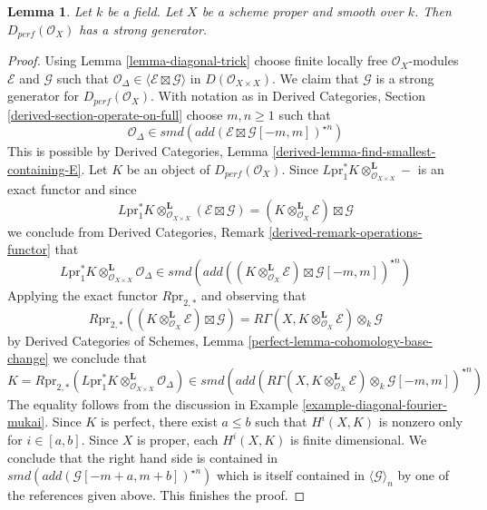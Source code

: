 \documentclass{stacks-project}
\theoremstyle{plain}
\newtheorem{lemma}[subsection]{Lemma}
\theoremstyle{definition}
\theoremstyle{remark}
\numberwithin{equation}{subsection}
\begin{document}
\begin{lemma}
\label{lemma-smooth-proper-strong-generator}
Let $k$ be a field. Let $X$ be a scheme proper and smooth over $k$.
Then $D_{perf}(\mathcal{O}_X)$
has a strong generator.
\end{lemma}

\begin{proof}
Using Lemma \ref{lemma-diagonal-trick} choose finite locally free
$\mathcal{O}_X$-modules $\mathcal{E}$ and $\mathcal{G}$ such that
$\mathcal{O}_\Delta \in \langle \mathcal{E} \boxtimes \mathcal{G} \rangle$
in $D(\mathcal{O}_{X \times X})$. We claim that $\mathcal{G}$
is a strong generator for $D_{perf}(\mathcal{O}_X)$. With notation as in
Derived Categories, Section \ref{derived-section-operate-on-full}
choose $m, n \geq 1$ such that
$$
\mathcal{O}_\Delta \in
smd(add(\mathcal{E} \boxtimes \mathcal{G}[-m, m])^{\star n})
$$
This is possible by Derived Categories, Lemma
\ref{derived-lemma-find-smallest-containing-E}.
Let $K$ be an object of $D_{perf}(\mathcal{O}_X)$. Since
$L\text{pr}_1^*K \otimes_{\mathcal{O}_{X \times X}}^\mathbf{L} -$
is an exact functor and since
$$
L\text{pr}_1^*K \otimes_{\mathcal{O}_{X \times X}}^\mathbf{L}
(\mathcal{E} \boxtimes \mathcal{G}) =
(K \otimes_{\mathcal{O}_X}^\mathbf{L} \mathcal{E}) \boxtimes \mathcal{G}
$$
we conclude from
Derived Categories, Remark \ref{derived-remark-operations-functor} that
$$
L\text{pr}_1^*K
\otimes_{\mathcal{O}_{X \times X}}^\mathbf{L}
\mathcal{O}_\Delta
\in
smd(add(
(K \otimes_{\mathcal{O}_X}^\mathbf{L} \mathcal{E})
\boxtimes \mathcal{G}[-m, m])^{\star n})
$$
Applying the exact functor $R\text{pr}_{2, *}$ and observing that
$$
R\text{pr}_{2, *}
\left((K \otimes_{\mathcal{O}_X}^\mathbf{L} \mathcal{E}) \boxtimes
\mathcal{G}\right) =
R\Gamma(X, K \otimes_{\mathcal{O}_X}^\mathbf{L} \mathcal{E})
\otimes_k \mathcal{G}
$$
by Derived Categories of Schemes, Lemma
\ref{perfect-lemma-cohomology-base-change} we conclude that
$$
K = R\text{pr}_{2, *}(L\text{pr}_1^*K
\otimes_{\mathcal{O}_{X \times X}}^\mathbf{L} \mathcal{O}_\Delta)
\in
smd(add(R\Gamma(X, K \otimes_{\mathcal{O}_X}^\mathbf{L} \mathcal{E})
\otimes_k \mathcal{G}[-m, m])^{\star n})
$$
The equality follows from the discussion in
Example \ref{example-diagonal-fourier-mukai}.
Since $K$ is perfect, there exist $a \leq b$ such that
$H^i(X, K)$ is nonzero only for $i \in [a, b]$. Since $X$ is proper,
each $H^i(X, K)$ is finite dimensional. We conclude that
the right hand side is contained in
$smd(add(\mathcal{G}[-m + a, m + b])^{\star n})$ which is
itself contained in $\langle \mathcal{G} \rangle_n$ by one of the
references given above. This finishes the proof.
\end{proof}
\end{document}
